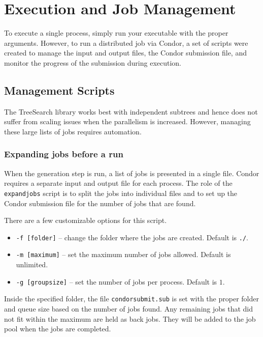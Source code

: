 \documentclass[11pt]{article}
\def\TreeSearch{{TreeSearch}}
\begin{document}
\section{Execution and Job Management}
\label{sec:Execution}

To execute a single process, simply run your executable with the proper arguments.
However, to run a distributed job via Condor, a set of scripts were created to manage
	the input and output files, the Condor submission file, and monitor the progress
	of the submission during execution.

\subsection{Management Scripts}


The {\TreeSearch} library works best with independent subtrees
	 and hence does not suffer from scaling issues when the parallelism is increased.
However, managing these large lists of jobs requires automation.

\subsubsection{Expanding jobs before a run}

When the generation step is run, a list of jobs is presented in a single file.
Condor requires a separate input and output file for each process.
The role of the \texttt{expandjobs} script is to split the jobs into individual 
	files and to set up the Condor submission file for the number of jobs that are found.

There are a few customizable options for this script.

\begin{itemize}
	\item \texttt{-f [folder]} -- change the folder where the jobs are created.  Default is \texttt{./}.
	\item \texttt{-m [maximum]} -- set the maximum number of jobs allowed.  Default is unlimited.
	\item \texttt{-g [groupsize]} -- set the number of jobs per process. Default is $1$.
\end{itemize}

Inside the specified folder, the file \texttt{condorsubmit.sub} is set with
	the proper folder and queue size based on the number of jobs found.
Any remaining jobs that did not fit within the maximum are held as back jobs.
They will be added to the job pool when the jobs are completed.
\end{document}
